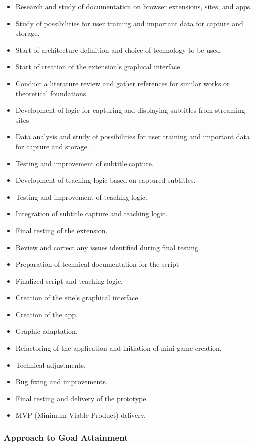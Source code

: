 \documentclass[12pt]{article}
\begin{document}
\begin{itemize}
\item Research and study of documentation on browser extensions, sites, and apps.
\item Study of possibilities for user training and important data for capture and storage.
\item Start of architecture definition and choice of technology to be used.
\item Start of creation of the extension's graphical interface.
\item Conduct a literature review and gather references for similar works or theoretical foundations.
\item Development of logic for capturing and displaying subtitles from streaming sites.
\item Data analysis and study of possibilities for user training and important data for capture and storage.
\item Testing and improvement of subtitle capture.
\item Development of teaching logic based on captured subtitles.
\item Testing and improvement of teaching logic.
\item Integration of subtitle capture and teaching logic.
\item Final testing of the extension.
\item Review and correct any issues identified during final testing.
\item Preparation of technical documentation for the script 
\item Finalized script and teaching logic.
\item Creation of the site's graphical interface.
\item Creation of the app. 
\item Graphic adaptation.
\item Refactoring of the application and initiation of mini-game creation.
\item Technical adjustments.
\item Bug fixing and improvements.
\item Final testing and delivery of the prototype.
\item MVP (Minimum Viable Product) delivery.
\end {itemize}

\subsubsection{Approach to Goal Attainment}
\end{document}
